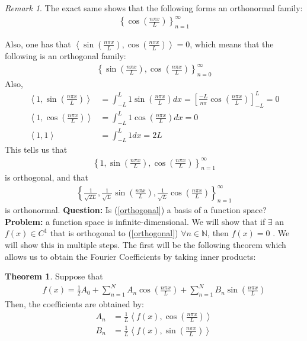 \documentclass[11pt]{scrartcl}
\theoremstyle{definition}
\newtheorem{theorem}{Theorem}
\theoremstyle{remark}
\newtheorem{remark}{Remark}
\newcommand{\idx}[2]{\int_{#1}^{#2}}
\newcommand{\ip}[2]{\left\langle #1, #2 \right\rangle}
\begin{document}
\begin{remark}
	The exact same shows that the following forms an orthonormal family: 
	\begin{align*}
		\left\{ \cos \left( \frac{n \pi x}{L} \right) \right\}_{n=1}^\infty 
	\end{align*}
\end{remark}
Also, one has that $\left\langle \sin \left( \frac{n \pi x}{L} \right), \cos \left( \frac{n \pi x}{L} \right) \right\rangle =0$, which means that the following is an orthogonal family:
\begin{align}
	\left\{  \sin \left( \frac{n \pi x}{L} \right), \cos \left( \frac{n \pi x}{L} \right) \right\}_{n=0}^\infty  	
\end{align}
Also, 
\begin{align*}
 \ip{1}{\sin\left( \frac{n \pi x}{L} \right) } & = \idx{-L}{L} 1 \sin \left( \frac{n \pi x}{L} \right) dx = \left[ \frac{-L}{n \pi } \cos \left( \frac{n \pi x}{L} \right) \right]_{-L}^L  = 0 \\
 \ip{1}{\cos\left( \frac{n \pi x}{L} \right) } & = \idx{-L}{L} 1 \cos \left( \frac{n \pi x}{L} \right) dx = 0 \\
 \ip{1}{1} & = \idx{-L}{L} 1 dx = 2L 
\end{align*}
This tells us that
\begin{align}\label{orthogonal} 
	\left\{ 1, \sin \left( \frac{n \pi x}{L} \right), \cos \left( \frac{n \pi x}{L} \right) \right\}_{n=1}^\infty 
\end{align}
is orthogonal, and that 
\begin{align}
		\left\{ \frac{1}{\sqrt{2L}} , \frac{1}{\sqrt{L}} \sin \left( \frac{n \pi x}{L} \right),  \frac{1}{\sqrt{L}} \cos \left( \frac{n \pi x}{L} \right) \right\}_{n=1}^\infty 	
\end{align}
is orthonormal. \textbf{Question:} Is (\ref{orthogonal}) a basis of a function space? \textbf{Problem:} a function space is infinite-dimensional. We will show that if $\exists$ an $f(x) \in C^1$ that is orthogonal to (\ref{orthogonal}) $\forall n \in \mathbb{N}$, then $f(x) = 0$ . We will show this in multiple steps. The first will be the following theorem which allows us to obtain the Fourier Coefficients by taking inner products: 

\begin{theorem}
	Suppose that
	\begin{align}
		f(x) = \frac{1}{2} A_0 + \sum_{n=1}^N A_n \cos \left( \frac{n \pi x}{L} \right) + \sum_{n=1}^N B_n \sin \left( \frac{n \pi x}{L} \right) 	
	\end{align}
	Then, the coefficients are obtained by: 
	\begin{align*}
		A_n & = \frac{1}{L} \ip{f(x)}{\cos \left( \frac{n \pi x}{L} \right)} \\
		B_n & = \frac{1}{L} \ip{f(x)}{ \sin \left( \frac{n \pi x}{L} \right)}
	\end{align*}
\end{theorem}
\end{document}
